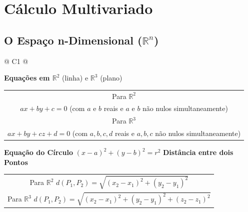 \section{Cálculo Multivariado}

	\subsection{O Espaço n-Dimensional ($\mathbb{R}^{n}$)}

		\begin{longtable}{
		@{}
		C{1\textwidth} 
		@{}}

			\toprule
			\textbf{Equações em $\mathbb{R}^{2}$} (linha) e $\mathbb{R}^{3}$ (plano)
			\tabularnewline
			\midrule
			{\large \begin{tabular}[c]{@{}c@{}}

				Para $\mathbb{R}^{2}$ \\
				
				$ax + by + c = 0$ (com $a$ e $b$ reais e $a$ e $b$ não nulos simultaneamente) \\

				Para $\mathbb{R}^{3}$ \\
				
				$ax + by + cz + d = 0$ (com $a, b, c, d$ reais e $a, b, c$ não nulos simultaneamente)

			\end{tabular}}
			\tabularnewline
			\midrule
			\textbf{Equação do Círculo}
			\tabularnewline
			\midrule
			{\large $(x - a)^{2} + (y - b)^{2} = r^{2}$}
			\tabularnewline
			\midrule
			\textbf{Distância entre dois Pontos}
			\tabularnewline
			\midrule
			{\large \begin{tabular}[c]{@{}c@{}}

				Para $\mathbb{R}^{2}$ \hspace{1cm} $d(P_{1}, P_{2}) = \sqrt{(x_{2} - x_{1})^{2} + (y_{2} - y_{1})^{2}}$ \\

				Para $\mathbb{R}^{3}$ \hspace{1cm} $d(P_{1}, P_{2}) = \sqrt{(x_{2} - x_{1})^{2} + (y_{2} - y_{1})^{2} + (z_{2} - z_{1})^{2}}$ \\


\end{tabular}}
\end{longtable}
